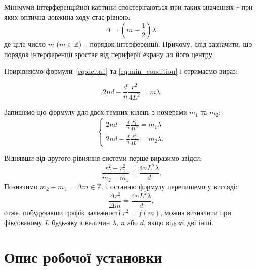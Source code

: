 Мінімуми інтерференційної картини спостерігаються при таких значеннях $r$ при яких оптична довжина ходу стає рівною:
\begin{equation}\label{eq:min_condition}
	\Delta = \left( m - \frac12 \right)  \lambda.
\end{equation}
де ціле число $m$ ($m \in \mathbb{Z}$) -- порядок інтерференції. Причому, слід зазначити, що порядок інтерференції зростає від периферії екрану до його центру.

Прирівняємо формули~\eqref{eq:delta1} та \eqref{eq:min_condition}  і  отримаємо вираз:

\begin{equation*}
	2nd - \frac{d}{n}  \frac{r^2}{4L^2} = m\lambda
\end{equation*}

Запишемо цю формулу для двох темних кілець з номерами $m_1$ та $m_2$:
\begin{equation*}
\begin{cases}
	2nd - \frac{d}{n}  \frac{r^2_1}{4L^2} = m_1\lambda\\
    2nd - \frac{d}{n}  \frac{r^2_2}{4L^2} = m_2\lambda.
\end{cases}
\end{equation*}

Віднявши від другого рівняння системи перше виразимо звідси:
\begin{equation*}
    \frac{r^2_2 - r^2_1}{m_2 - m_1}  = \frac{4nL^2\lambda}{d}.
\end{equation*}
Позначимо $m_2 - m_1 = \Delta m \in \mathbb{Z}$, і останню формулу перепишемо у вигляді:
\begin{equation}\label{eq:slope}
    \frac{\Delta r^2}{\Delta m}  = \frac{4nL^2\lambda}{d},
\end{equation}
отже, побудувавши графік залежності $r^2 = f(m)$, можна визначити при фіксованому $L$ будь-яку з величин $\lambda$, $n$ або $d$, якщо відомі дві інші.


\section{Опис робочої установки}

